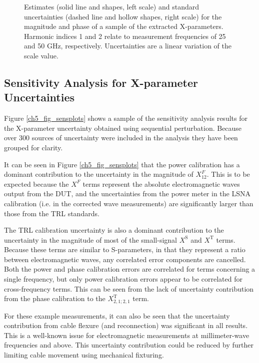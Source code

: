 \documentclass[../thesis/thesis.tex]{subfiles}
\begin{document}
\begin{figure}
\begin{subfigure}{0.45\textwidth}
		\label{ch5_fig_t212kp}
	\end{subfigure}
	\caption[Estimates and standard uncertainties for the magnitude and phase of a sample of the extracted X-parameters.]{Estimates (solid line and shapes, left scale) and standard uncertainties (dashed line and hollow shapes, right scale) for the magnitude and phase of a sample of the extracted X-parameters. Harmonic indices 1 and 2 relate to measurement frequencies of 25 and 50 GHz, respectively. Uncertainties are a linear variation of the scale value.}
	\label{ch5_fig_summaryplots}
\end{figure}

\subsection{Sensitivity Analysis for X-parameter Uncertainties}

Figure \ref{ch5_fig_sensplots} shows a sample of the sensitivity analysis results for the X-parameter uncertainty obtained using sequential perturbation. Because over 300 sources of uncertainty were included in the analysis they have been grouped for clarity.

It can be seen in Figure \ref{ch5_fig_sensplots} that the power calibration has a dominant contribution to the uncertainty in the magnitude of $X^F_{12}$. This is to be expected because the $X^F$ terms represent the absolute electromagnetic waves output from the DUT, and the uncertainties from the power meter in the LSNA calibration (i.e. in the corrected wave measurements) are significantly larger than those from the TRL standards.

The TRL calibration uncertainty is also a dominant contribution to the uncertainty in the magnitude of most of the small-signal $X^\textrm{S}$ and $X^\textrm{T}$ terms. Because these terms are similar to S-parameters, in that they represent a ratio between electromagnetic waves, any correlated error components are cancelled. Both the power and phase calibration errors are correlated for terms concerning a single frequency, but only power calibration errors appear to be correlated for cross-frequency terms. This can be seen from the lack of uncertainty contribution from the phase calibration to the $X^\textrm{T}_{2,1;2,1}$ term.

For these example measurements, it can also be seen that the uncertainty contribution from cable flexure (and reconnection) was significant in all results. This is a well-known issue for electromagnetic measurements at millimeter-wave frequencies and above. This uncertainty contribution could be reduced by further limiting cable movement using mechanical fixturing.
\end{document}
